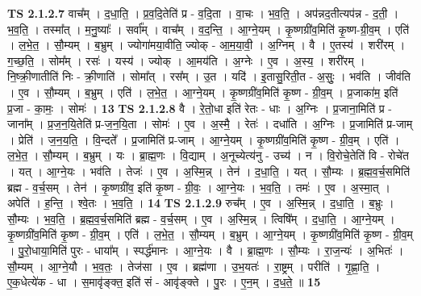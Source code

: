 \documentclass[17pt]{extarticle}
\begin{document}
                  \newline
                                \textbf{ TS 2.1.2.7} \newline
                  वाच᳚म् । द॒धा॒ति॒ । प्र॒व॒दि॒तेति॑ प्र - व॒दि॒ता । वा॒चः । भ॒व॒ति॒ । अप॑न्नद॒तीत्यप॑न्न - द॒ती॒ । भ॒व॒ति॒ । तस्मा᳚त् । म॒नु॒ष्याः᳚ । सर्वा᳚म् । वाच᳚म् । व॒द॒न्ति॒ । आ॒ग्ने॒यम् । कृ॒ष्णग्री॑व॒मिति॑ कृ॒ष्ण-ग्री॒व॒म् । एति॑ । ल॒भे॒त॒ । सौ॒म्यम् । ब॒भ्रुम् । ज्योगा॑मया॒वीति॒ ज्योक् - आ॒म॒या॒वी॒ । अ॒ग्निम् । वै । ए॒तस्य॑ । शरी॑रम् । ग॒च्छ॒ति॒ । सोम᳚म् । रसः॑ । यस्य॑ । ज्योक् । आ॒मय॑ति । अ॒ग्नेः । ए॒व । अ॒स्य॒ । शरी॑रम् । नि॒ष्क्री॒णातीति॑ निः - क्री॒णाति॑ । सोमा᳚त् । रस᳚म् । उ॒त । यदि॑ । इ॒तासु॒रिती॒त - अ॒सुः॒ । भव॑ति । जीव॑ति । ए॒व । सौ॒म्यम् । ब॒भ्रुम् । एति॑ । ल॒भे॒त॒ । आ॒ग्ने॒यम् । कृ॒ष्णग्री॑व॒मिति॑ कृ॒ष्ण - ग्री॒व॒म् । प्र॒जाका॑म॒ इति॑ प्र॒जा - का॒मः॒ । सोमः॑ । \textbf{  13} \newline
                  \newline
                                \textbf{ TS 2.1.2.8} \newline
                  वै । रे॒तो॒धा इति॑ रेतः - धाः । अ॒ग्निः । प्र॒जाना॒मिति॑ प्र - जाना᳚म् । प्र॒ज॒न॒यि॒तेति॑ प्र-ज॒न॒यि॒ता । सोमः॑ । ए॒व । अ॒स्मै॒ । रेतः॑ । दधा॑ति । अ॒ग्निः । प्र॒जामिति॑ प्र-जाम् । प्रेति॑ । ज॒न॒य॒ति॒ । वि॒न्दते᳚ । प्र॒जामिति॑ प्र-जाम् । आ॒ग्ने॒यम् । कृ॒ष्णग्री॑व॒मिति॑ कृ॒ष्ण - ग्री॒व॒म् । एति॑ । ल॒भे॒त॒ । सौ॒म्यम् । ब॒भ्रुम् । यः । ब्रा॒ह्म॒णः । वि॒द्याम् । अ॒नूच्येत्य॑नु - उच्य॑ । न । वि॒रोचे॒तेति॑ वि - रोचे॑त । यत् । आ॒ग्ने॒यः । भव॑ति । तेजः॑ । ए॒व । अ॒स्मि॒न्न् । तेन॑ । द॒धा॒ति॒ । यत् । सौ॒म्यः । ब्र॒ह्म॒व॒र्च॒समिति॑ ब्रह्म - व॒र्च॒सम् । तेन॑ । कृ॒ष्णग्री॑व॒ इति॑ कृ॒ष्ण - ग्री॒वः॒ । आ॒ग्ने॒यः । भ॒व॒ति॒ । तमः॑ । ए॒व । अ॒स्मा॒त् । अपेति॑ । ह॒न्ति॒ । श्वे॒तः । भ॒व॒ति॒ । \textbf{  14} \newline
                  \newline
                                \textbf{ TS 2.1.2.9} \newline
                  रुच᳚म् । ए॒व । अ॒स्मि॒न्न् । द॒धा॒ति॒ । ब॒भ्रुः । सौ॒म्यः । भ॒व॒ति॒ । ब्र॒ह्म॒व॒र्च॒समिति॑ ब्रह्म - व॒र्च॒सम् । ए॒व । अ॒स्मि॒न्न् । त्विषि᳚म् । द॒धा॒ति॒ । आ॒ग्ने॒यम् । कृ॒ष्णग्री॑व॒मिति॑ कृ॒ष्ण - ग्री॒व॒म् । एति॑ । ल॒भे॒त॒ । सौ॒म्यम् । ब॒भ्रुम् । आ॒ग्ने॒यम् । कृ॒ष्णग्री॑व॒मिति॑ कृ॒ष्ण - ग्री॒व॒म् । पु॒रो॒धाया॒मिति॑ पुरः - धाया᳚म् । स्पर्द्ध॑मानः । आ॒ग्ने॒यः । वै । ब्रा॒ह्म॒णः । सौ॒म्यः । रा॒ज॒न्यः॑ । अ॒भितः॑ । सौ॒म्यम् । आ॒ग्ने॒यौ । भ॒व॒तः॒ । तेज॑सा । ए॒व । ब्रह्म॑णा । उ॒भ॒यतः॑ । रा॒ष्ट्रम् । परीति॑ । गृ॒ह्णा॒ति॒ । ए॒क॒धेत्ये॑क - धा । स॒मावृ॑ङ्क्त॒ इति॑ सं - आवृ॑ङ्क्ते । पु॒रः । ए॒न॒म् । द॒ध॒ते॒ ॥ \textbf{  15} \newline
\end{document}
